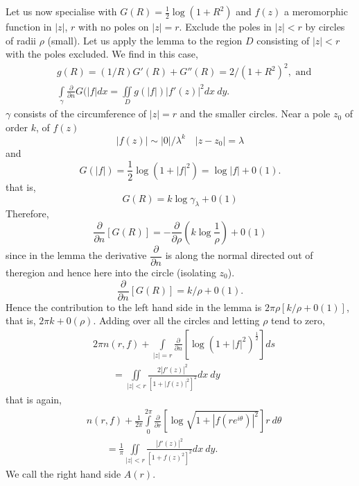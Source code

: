 Let us now specialise with $G(R)=\frac{1}{2}\log(1+R^{2})$ and $f(z)$
a meromorphic function in $|z|$, $r$ with no poles on $|z|=r$. Exclude
the poles in $|z|<r$ by circles of radii $\rho$ (small). Let us apply
the lemma to the region $D$ consisting of $|z|<r$ with the poles
excluded. We find in this case,
\begin{align*}
& g(R) = (1/R)G'(R)+G''(R)=2/(1+R^{2})^{2},\text{ \ and}\\
& \int\limits_{\gamma}\frac{\partial}{\partial
    n}G(|f|dx=\iint\limits_{D}g(|f|)|f'(z)|^{2}dx\ dy.
\end{align*}
$\gamma$ consists of the circumference of $|z|=r$ and the smaller
  circles. Near a pole $z_{0}$ of order $k$, of $f(z)$
$$
|f(z)|\sim |0|/\lambda^{k}\quad |z-z_{0}|=\lambda
$$
and 
$$
G(|f|)=\frac{1}{2}\log (1+|f|^{2})=\log |f|+0(1).
$$
that is,
$$
G(R)=k\log \gamma_{\lambda}+0(1)
$$
Therefore,
$$
\frac{\partial}{\partial n}[G(R)]=-\frac{\partial}{\partial
  \rho}\left(k\log\frac{1}{\rho}\right)+0(1)
$$
since in the lemma the derivative $\dfrac{\partial}{\partial n}$ is
along the normal directed out of the\pageoriginale region and hence
here into the circle (isolating $z_{0}$).
$$
\frac{\partial}{\partial n}[G(R)]=k/\rho+0(1).
$$
Hence the contribution to the left hand side in the lemma is $2\pi
\rho[k/\rho+0(1)]$, that is, $2\pi k+0(\rho)$.
Adding over all the circles and letting $\rho$ tend to zero,
\begin{align*}
& 2\pi n(r,f) +\int\limits_{|z|=r}\frac{\partial}{\partial
  n}[\log(1+|f|^{2})^{\frac{1}{2}}]ds\\
&\qquad =\iint\limits_{|z|<r}\frac{2|f'(z)|^{2}}{[1+|f(z)|^{2}]^{2}}dx\ dy
\end{align*}
that is again,
\begin{align*}
& n(r,f) +\frac{1}{2\pi}\int\limits^{2\pi}_{0}\frac{\partial}{\partial
  r}\left[\log \sqrt{1+|f(re^{i\theta})|^{2}}\right]r\ d\theta\\
&\qquad
  =\frac{1}{\pi}\iint\limits_{|z|<r}\frac{|f'(z)|^{2}}{[1+f(z)^{2}]^{2}}dx\ dy.
\end{align*}
We call the right hand side $A(r)$.

